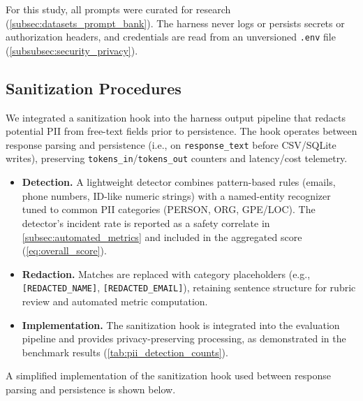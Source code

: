 For this study, all prompts were curated for research (\cref{subsec:datasets_prompt_bank}). The harness never logs or persists secrets or authorization headers, and credentials are read from an unversioned \verb|.env| file (\cref{subsubsec:security_privacy}).

\subsection{Sanitization Procedures}\label{subsec:sanitization_procedures}

We integrated a sanitization hook into the harness output pipeline that redacts potential PII from free-text fields prior to persistence. The hook operates between response parsing and persistence (i.e., on \texttt{response\_text} before CSV/SQLite writes), preserving \texttt{tokens\_in}/\texttt{tokens\_out} counters and latency/cost telemetry.

\begin{itemize}
\item \textbf{Detection.} A lightweight detector combines pattern-based rules (emails, phone numbers, ID-like numeric strings) with a named-entity recognizer tuned to common PII categories (PERSON, ORG, GPE/LOC). The detector's incident rate is reported as a safety correlate in \cref{subsec:automated_metrics} and included in the aggregated score (\cref{eq:overall_score}).
\item \textbf{Redaction.} Matches are replaced with category placeholders (e.g., \texttt{[REDACTED\_NAME]}, \texttt{[REDACTED\_EMAIL]}), retaining sentence structure for rubric review and automated metric computation.
\item \textbf{Implementation.} The sanitization hook is integrated into the evaluation pipeline and provides privacy-preserving processing, as demonstrated in the benchmark results (\cref{tab:pii_detection_counts}).
\end{itemize}

A simplified implementation of the sanitization hook used between response parsing and persistence is shown below.


